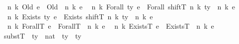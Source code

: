 \begin{isabellebody}
{\isacharbar}{\kern0pt}\ {\isachardoublequoteopen}{\isasymup}\isactrlsub {\isasymtau}\ n\ k\ {\isacharparenleft}{\kern0pt}Old\ e{\isacharparenright}{\kern0pt}\ {\isacharequal}{\kern0pt}\ Old\ {\isacharparenleft}{\kern0pt}{\isasymup}\isactrlsub {\isasymtau}\ n\ k\ e{\isacharparenright}{\kern0pt}{\isachardoublequoteclose}\isanewline
{\isacharbar}{\kern0pt}\ {\isachardoublequoteopen}{\isasymup}\isactrlsub {\isasymtau}\ n\ k\ {\isacharparenleft}{\kern0pt}Forall\ ty\ e{\isacharparenright}{\kern0pt}\ {\isacharequal}{\kern0pt}\ {\isacharparenleft}{\kern0pt}Forall\ {\isacharparenleft}{\kern0pt}shiftT\ n\ k\ ty{\isacharparenright}{\kern0pt}\ {\isacharparenleft}{\kern0pt}{\isasymup}\isactrlsub {\isasymtau}\ n\ k\ e{\isacharparenright}{\kern0pt}{\isacharparenright}{\kern0pt}{\isachardoublequoteclose}\isanewline
{\isacharbar}{\kern0pt}\ {\isachardoublequoteopen}{\isasymup}\isactrlsub {\isasymtau}\ n\ k\ {\isacharparenleft}{\kern0pt}Exists\ ty\ e{\isacharparenright}{\kern0pt}\ {\isacharequal}{\kern0pt}\ {\isacharparenleft}{\kern0pt}Exists\ {\isacharparenleft}{\kern0pt}shiftT\ n\ k\ ty{\isacharparenright}{\kern0pt}\ {\isacharparenleft}{\kern0pt}{\isasymup}\isactrlsub {\isasymtau}\ n\ k\ e{\isacharparenright}{\kern0pt}{\isacharparenright}{\kern0pt}{\isachardoublequoteclose}\isanewline
{\isacharbar}{\kern0pt}\ {\isachardoublequoteopen}{\isasymup}\isactrlsub {\isasymtau}\ n\ k\ {\isacharparenleft}{\kern0pt}ForallT\ e{\isacharparenright}{\kern0pt}\ {\isacharequal}{\kern0pt}\ {\isacharparenleft}{\kern0pt}ForallT\ {\isacharparenleft}{\kern0pt}{\isasymup}\isactrlsub {\isasymtau}\ n\ {\isacharparenleft}{\kern0pt}k{\isacharplus}{\kern0pt}{}{\isacharparenright}{\kern0pt}\ e{\isacharparenright}{\kern0pt}{\isacharparenright}{\kern0pt}{\isachardoublequoteclose}\isanewline
{\isacharbar}{\kern0pt}\ {\isachardoublequoteopen}{\isasymup}\isactrlsub {\isasymtau}\ n\ k\ {\isacharparenleft}{\kern0pt}ExistsT\ e{\isacharparenright}{\kern0pt}\ {\isacharequal}{\kern0pt}\ {\isacharparenleft}{\kern0pt}ExistsT\ {\isacharparenleft}{\kern0pt}{\isasymup}\isactrlsub {\isasymtau}\ n\ {\isacharparenleft}{\kern0pt}k{\isacharplus}{\kern0pt}{}{\isacharparenright}{\kern0pt}\ e{\isacharparenright}{\kern0pt}{\isacharparenright}{\kern0pt}{\isachardoublequoteclose}\isanewline
\isanewline
\isanewline
{}\isamarkupfalse%
\ substT\ {\isacharcolon}{\kern0pt}{\isacharcolon}{\kern0pt}\ {\isachardoublequoteopen}ty\ {\isasymRightarrow}\ nat\ {\isasymRightarrow}\ ty\ {\isasymRightarrow}\ ty{\isachardoublequoteclose}\ \ {\isacharparenleft}{\kern0pt}{\isachardoublequoteopen}{\isacharunderscore}{\kern0pt}{\isacharbrackleft}{\kern0pt}{\isacharunderscore}{\kern0pt}\ {\isasymmapsto}\isactrlsub {\isasymtau}\ {\isacharunderscore}{\kern0pt}{\isacharbrackright}{\kern0pt}\isactrlsub {\isasymtau}{\isachardoublequoteclose}\ {\isacharbrackleft}{\kern0pt}{}{}{}{\isacharcomma}{\kern0pt}\ {}{\isacharcomma}{\kern0pt}\ {}{\isacharbrackright}{\kern0pt}\ {}{}{}{\isacharparenright}{\kern0pt}\isanewline

\end{isabellebody}
